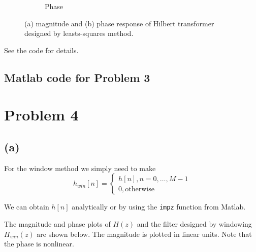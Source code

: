 \documentclass{article}
\begin{document}
\begin{figure}[h!]
\begin{subfigure}[h!]{0.5\textwidth}
		\caption{Phase}
	\end{subfigure}
	\caption{(a) magnitude and (b) phase response of Hilbert transformer designed by leasts-squares method.}
\end{figure}
\FloatBarrier

See the code for details.

\subsection{Matlab code for Problem 3}


\newpage
\section{Problem 4}
\subsection{(a)}

For the window method we simply need to make
\begin{equation}
	h_{win}[n] = \begin{cases}
	h[n], n = 0, \ldots, M-1 \\
	0, \text{otherwise}
	\end{cases}
\end{equation}

We can obtain $h[n]$ analytically or by using the \texttt{impz} function from Matlab. 

The magnitude and phase plots of $H(z)$ and the filter designed by windowing $H_{win}(z)$ are shown below. The magnitude is plotted in linear units. Note that the phase is nonlinear.
\end{document}
